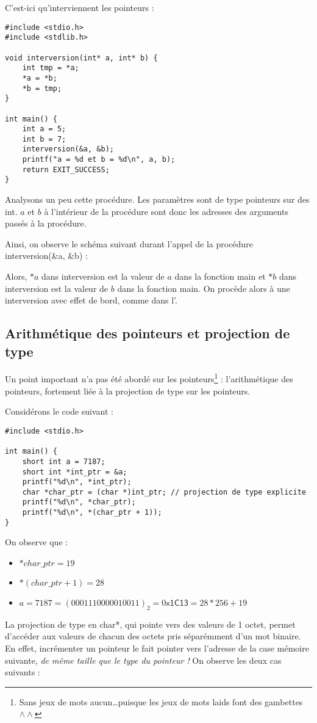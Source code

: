 \documentclass[../../../main.tex]{subfiles}
\begin{document}
C'est-ici qu'interviennent les pointeurs :
\begin{verbatim}
#include <stdio.h>
#include <stdlib.h>

void interversion(int* a, int* b) {
	int tmp = *a;
	*a = *b;
	*b = tmp;
}

int main() {
	int a = 5;
	int b = 7;
	interversion(&a, &b);
	printf("a = %d et b = %d\n", a, b);
	return EXIT_SUCCESS;
}
\end{verbatim}
Analysons un peu cette procédure. Les paramètres sont de type pointeurs sur des \textsf{int}. $a$ et $b$ à l'intérieur de la procédure sont donc les adresses des arguments passés à la procédure.
 
Ainsi, on observe le schéma suivant durant l'appel de la procédure \textsf{interversion(\&a, \&b)} :  

\begin{minipage}{\textwidth}
	\begin{center}
		
	\end{center}
\end{minipage}
 
Alors, $*a$ dans \textsf{interversion} est la valeur de $a$ dans la fonction \textsf{main} et $*b$ dans \textsf{interversion} est la valeur de $b$ dans la fonction \textsf{main}. On procède alors à une interversion avec effet de bord, comme dans l'.
 
\subsection{Arithmétique des pointeurs et projection de type}
\label{sub:arithm_tique_des_pointeurs_et_projection_de_type}
Un point important n'a pas été abordé sur les pointeurs\footnote{Sans jeux de mots aucun\dots puisque les jeux de mots laids font des gambettes $\wedge\wedge$} : l'arithmétique des pointeurs, fortement liée à la projection de type sur les pointeurs.
 
Considérons le code suivant :
\begin{verbatim}
#include <stdio.h>

int main() {
	short int a = 7187;
	short int *int_ptr = &a;
	printf("%d\n", *int_ptr);
	char *char_ptr = (char *)int_ptr; // projection de type explicite
	printf("%d\n", *char_ptr);
	printf("%d\n", *(char_ptr + 1));
}
\end{verbatim}
On observe que :
\begin{itemize}
	\item $*char\_ptr = 19$
	\item $*(char\_ptr + 1) = 28$
	\item $a = 7187 = (0001110000010011)_{2} = 0\textsf{x1C13} = 28 * 256 + 19$
\end{itemize}
La projection de type en \textsf{char*}, qui pointe vers des valeurs de 1 octet, permet d'accéder aux valeurs de chacun des octets pris séparémment d'un mot binaire. En effet, incrémenter un pointeur le fait pointer vers l'adresse de la case mémoire suivante, \textit{de même taille que le type du pointeur !} On observe les deux cas suivants : 
\end{document}
